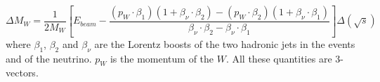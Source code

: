%

\begin{equation}
\Delta M_W=\frac{1}{2M_W}\left[E_{beam}-\frac
{(p_W\cdot\beta_1)(1+\beta_\nu\cdot\beta_2)-(p_W\cdot\beta_2)(1+\beta_\nu\cdot\beta_1)}
{\beta_\nu\cdot\beta_2-\beta_\nu\cdot\beta_1}\right]\Delta(\sqrt{s})
\end{equation}
where $\beta_1$, $\beta_2$ and $\beta_\nu$ are the Lorentz boosts of the two hadronic jets
in the events and of the neutrino. $p_W$ is the momentum of the $W$. All these quantities 
are 3-vectors.
%

  